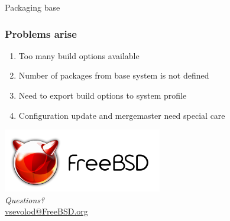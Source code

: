 \documentclass{beamer}
\begin{document}
\begin{frame}
\begin{center}
\huge{Packaging base}
\end{center}
\end{frame}

\begin{frame}
\frametitle{Problems arise}
\begin{enumerate}
  \item Too many build options available
  \item Number of packages from base system is not defined
  \item Need to export build options to system profile
  \item Configuration update and mergemaster need special care
\end{enumerate}
\end{frame}

\begin{frame}
\begin{center}
\includegraphics{logo.pdf} \\
\emph{Questions?} \\[4pt]
\url{vsevolod@FreeBSD.org}
\end{center}
\end{frame}
\end{document}
